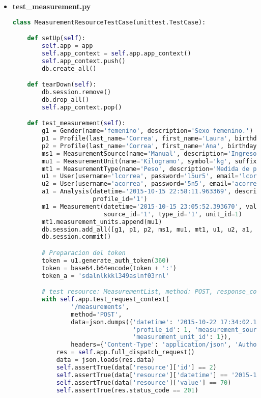 \begin{itemize}

\item \textbf{test\_measurement.py}

\begin{lstlisting}[language=Python]
class MeasurementResourceTestCase(unittest.TestCase):

    def setUp(self):
        self.app = app
        self.app_context = self.app.app_context()
        self.app_context.push()
        db.create_all()

    def tearDown(self):
        db.session.remove()
        db.drop_all()
        self.app_context.pop()

    def test_measurement(self):
        g1 = Gender(name='femenino', description='Sexo femenino.')
        p1 = Profile(last_name='Correa', first_name='Laura', birthday='1998-08-20', gender_id='1')
        p2 = Profile(last_name='Correa', first_name='Ana', birthday='1998-04-10', gender_id='1')
        ms1 = MeasurementSource(name='Manual', description='Ingreso manual de la medida.')
        mu1 = MeasurementUnit(name='Kilogramo', symbol='kg', suffix='True')
        mt1 = MeasurementType(name='Peso', description='Medida de peso de una persona')
        u1 = User(username='lcorrea', password='l5ur5', email='lcorrea@yesdoc.com', profile_id='1')
        u2 = User(username='acorrea', password='5n5', email='acorrea@yesdoc.com', profile_id='2')
        a1 = Analysis(datetime='2015-10-15 22:58:11.963369', description='Primer toma de medidas de peso',
                      profile_id='1')
        m1 = Measurement(datetime='2015-10-15 23:05:52.393670', value='74', analysis_id='1', profile_id='1',
                         source_id='1', type_id='1', unit_id=1)
        mt1.measurement_units.append(mu1)
        db.session.add_all([g1, p1, p2, ms1, mu1, mt1, u1, u2, a1, m1])
        db.session.commit()

        # Preparacion del token
        token = u1.generate_auth_token(360)
        token = base64.b64encode(token + ':')
        token_a = 'sdalnlkkkl349aslnf03rnl'

        # test resource: MeasurementList, method: POST, response_code: 201, con autorizacion
        with self.app.test_request_context(
                '/measurements',
                method='POST',
                data=json.dumps({'datetime': '2015-10-22 17:34:02.175126', 'value': 70, 'analysis_id': 1,
                                 'profile_id': 1, 'measurement_source_id': 1, 'measurement_type_id': 1,
                                 'measurement_unit_id': 1}),
                headers={'Content-Type': 'application/json', 'Authorization': 'Basic ' + token}):
            res = self.app.full_dispatch_request()
            data = json.loads(res.data)
            self.assertTrue(data['resource']['id'] == 2)
            self.assertTrue(data['resource']['datetime'] == '2015-10-22T17:34:02.175126')
            self.assertTrue(data['resource']['value'] == 70)
            self.assertTrue(res.status_code == 201)


\end{lstlisting}
\end{itemize}
